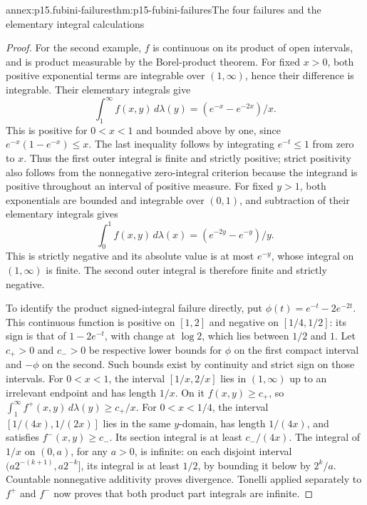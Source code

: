 \begin{annexitem}{annex:p15.fubini-failures}{thm:p15-fubini-failures}{The four failures and the elementary integral calculations}
\begin{proof}
For the second example, \(f\) is continuous on its product of open
intervals, and is product measurable by the Borel-product theorem.
For fixed \(x>0\), both positive exponential terms are integrable
over \((1,\infty)\), hence their difference is integrable. Their
elementary integrals give
\[
 \int_1^\infty f(x,y)\,d\lambda(y)
                  =(e^{-x}-e^{-2x})/x.
\]
This is positive for \(0<x<1\) and bounded above by one, since
\(e^{-x}(1-e^{-x})\leq x\). The last inequality follows by
integrating \(e^{-t}\leq1\) from zero to \(x\).
Thus the first outer integral is finite and strictly positive; strict
positivity also follows from the nonnegative zero-integral criterion
because the integrand is positive throughout an interval of positive measure.
For fixed \(y>1\), both exponentials are bounded and integrable
over \((0,1)\), and subtraction of their elementary integrals gives
\[
 \int_0^1 f(x,y)\,d\lambda(x)
                  =(e^{-2y}-e^{-y})/y.
\]
This is strictly negative and its absolute value is at most \(e^{-y}\),
whose integral on \((1,\infty)\) is finite. The second outer integral
is therefore finite and strictly negative.

To identify the product signed-integral failure directly, put
\(\phi(t)=e^{-t}-2e^{-2t}\). This continuous function is positive
on \([1,2]\) and negative on \([1/4,1/2]\): its sign is that of
\(1-2e^{-t}\), with change at \(\log 2\), which lies between
\(1/2\) and \(1\). Let \(c_+>0\) and \(c_->0\) be respective
lower bounds for \(\phi\) on the first compact interval and
\(-\phi\) on the second. Such bounds exist by continuity and strict
sign on those intervals. For \(0<x<1\), the interval
\([1/x,2/x]\) lies in \((1,\infty)\) up to an irrelevant endpoint
and has length \(1/x\). On it \(f(x,y)\geq c_+\), so
\(\int_1^\infty f^+(x,y)\,d\lambda(y)\geq c_+/x\).
For \(0<x<1/4\), the interval \([1/(4x),1/(2x)]\) lies in
the same \(y\)-domain, has length \(1/(4x)\), and satisfies
\(f^-(x,y)\geq c_-\). Its section integral is at least
\(c_-/(4x)\). The integral of \(1/x\) on \((0,a)\), for
any \(a>0\), is infinite: on each disjoint interval
\((a2^{-(k+1)},a2^{-k}]\), its integral is at least \(1/2\),
by bounding it below by \(2^k/a\). Countable nonnegative
additivity proves divergence. Tonelli applied separately to \(f^+\)
and \(f^-\) now proves that both product part integrals are infinite.


\end{proof}
\end{annexitem}
